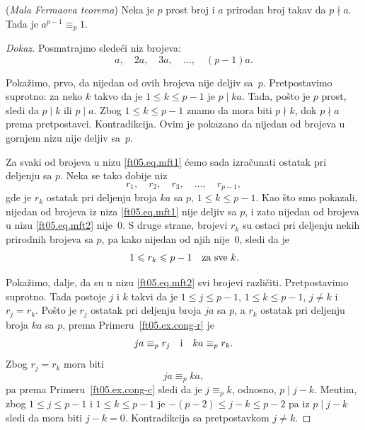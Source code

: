 \begin{EX} (\textit{Mala Fermaova teorema})
  Neka je $p$ prost broj i $a$ prirodan broj takav da $p \nmid a$. Tada je
  $a^{p-1} \equiv_p 1$.
\end{EX}
\begin{proof}[Dokaz]
  Posmatrajmo slede\'ci niz brojeva:
  \begin{equation}\label{ft05.eq.mft1}
    a, \quad 2a, \quad 3a, \quad \ldots, \quad (p - 1)a.
  \end{equation}

  Poka\v zimo, prvo, da nijedan od ovih brojeva nije deljiv sa~$p$. Pretpostavimo suprotno: za neko
  $k$ takvo da je $1 \le k \le p-1$ je $p \mid k a$. Tada, po\v sto je $p$ prost, sledi da
  $p \mid k$ ili $p \mid a$. Zbog $1 \le k \le p-1$ znamo da mora biti $p \nmid k$, dok
  $p \nmid a$ prema pretpostavci. Kontradikcija. Ovim je pokazano da nijedan od brojeva u gornjem nizu
  nije deljiv sa~$p$.

  Za svaki od brojeva u nizu \eqref{ft05.eq.mft1} \'cemo sada izra\v cunati ostatak pri deljenju sa $p$. Neka se tako
  dobije niz
  \begin{equation}\label{ft05.eq.mft2}
    r_1, \quad r_2, \quad r_3, \quad \ldots, \quad r_{p-1},
  \end{equation}
  gde je $r_k$ ostatak pri deljenju broja $k a$ sa $p$, $1 \le k \le p-1$. Kao \v sto smo
  pokazali, nijedan od brojeva iz niza \eqref{ft05.eq.mft1} nije deljiv sa $p$, i zato nijedan
  od brojeva u nizu \eqref{ft05.eq.mft2} nije~0. S druge strane, brojevi $r_k$ su
  ostaci pri deljenju nekih prirodnih brojeva sa $p$, pa kako nijedan od njih nije~0, sledi da je
  $$
    1 \le r_k \le p-1 \text{\quad za sve~$k$.}
  $$
  
  Poka\v zimo, dalje, da su u nizu \eqref{ft05.eq.mft2} svi brojevi razli\v citi.
  Pretpostavimo suprotno. Tada postoje $j$ i $k$ takvi da je
  $1 \le j \le p-1$, $1 \le k \le p-1$, $j \ne k$ i $r_j = r_k$. Po\v sto je $r_j$ ostatak
  pri deljenju broja $j a$ sa $p$, a $r_k$ ostatak pri deljenju broja $k a$ sa $p$,
  prema Primeru~\ref{ft05.ex.cong-r} je
  $$
    j a \equiv_p r_j \text{\quad i\quad} k a \equiv_p r_k.
  $$
  Zbog $r_j = r_k$ mora biti
  $$
    j a \equiv_p k a,
  $$
  pa prema Primeru~\ref{ft05.ex.cong-c} sledi da je $j \equiv_p k$, odnosno,
  $p \mid j - k$. Me\dj utim, zbog $1 \le j \le p-1$ i $1 \le k \le p-1$ je
  $-(p-2) \le j - k \le p-2$ pa iz $p \mid j - k$ sledi da mora biti $j - k = 0$. Kontradikcija
  sa pretpostavkom $j \ne k$.
  

\end{proof}
